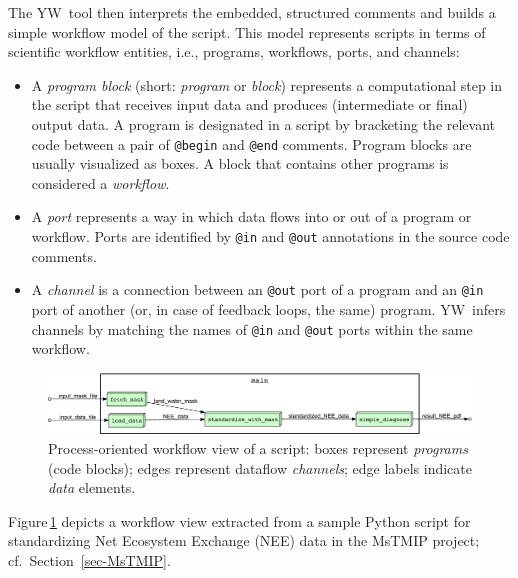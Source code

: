\documentclass{article}
\newcommand{\yw}{\textsf{YW}}
\newcommand{\ywa}[1]{\texttt{#1}}
\newcommand{\figref}[1]{Figure\,\ref{#1}}
\begin{document}
The \yw\ tool then interprets the embedded, structured comments and
builds a simple workflow model of the script. This model represents
scripts in terms of scientific workflow entities, i.e., programs,
workflows, ports, and channels:

\begin{itemize}
\item A \emph{program block} (short: \emph{program} or \emph{block})
  represents a computational step in the script that receives input
  data and produces (intermediate or final) output data. A program is
  designated in a script by bracketing the relevant code between a
  pair of \ywa{@begin} and \ywa{@end} comments. Program blocks are
  usually visualized as boxes. A block that contains other programs is
  considered a \emph{workflow}. \item A \emph{port} represents a way
  in which data flows into or out of a program or workflow. Ports are
  identified by \ywa{@in} and \ywa{@out} annotations in the source
  code comments.
\item A \emph{channel} is a connection between an \ywa{@out} port
of a program and an \ywa{@in} port of another (or, in case of feedback
loops, the same) program. \yw\ infers
channels by matching the names of \ywa{@in} and \ywa{@out} 
ports within the same workflow.
\end{itemize}

 \begin{figure}[t]
   \centering
   \includegraphics[width=1.0\textwidth]{figures/example_process-crop.pdf}
   \caption{Process-oriented workflow view of a script: boxes
     represent \emph{programs} (code blocks); edges represent dataflow
     \emph{channels}; edge labels indicate \emph{data}
     elements.}
   \label{fig-simple-process}
 \end{figure}



 \noindent \figref{fig-simple-process} depicts a workflow view
 extracted from a sample Python script for standardizing Net Ecosystem
 Exchange (NEE) data in the MsTMIP project; cf.\
 Section~\ref{sec-MsTMIP}.
\end{document}
